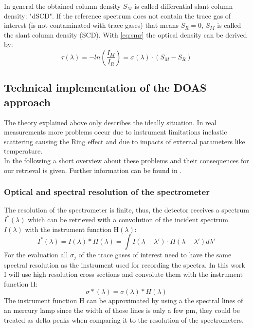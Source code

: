 \documentclass  [
  paper    = a4,
  BCOR     = 10mm,
  twoside,
  fontsize = 12pt,
  fleqn,
  toc      = bibnumbered,
  toc      = listofnumbered,
  numbers  = noendperiod,
  headings = normal,
  listof   = leveldown,
  version  = 3.03
]                                       {scrreprt}
\begin{document}
	In general the obtained column density $S_{M}$ is called differential slant column density: "dSCD". If the reference spectrum does not contain the trace gas of interest (is not contaminated with trace gases) that means $S_{R} = 0$, $S_{M}$ is called the slant column	density (SCD). 
	With \cref{eq:smr} the optical density can be derived by:
	\begin{equation}
	\tau\left(\lambda\right) = -ln\left(\frac{I_{M}}{I_{R}}\right) = \sigma\left(\lambda\right)\cdot\left(S_{M}-S_{R}\right)
	\end{equation}
	
	
	\subsection{Technical implementation of the DOAS approach}
	The theory explained above only describes the ideally situation. In real measurements more problems occur due to instrument limitations inelastic scattering causing the Ring effect and due to impacts of external parameters like temperature.\\
	In the following a short overview about these problems and their consequences for our retrieval is given. Further information can be found in \citet{lubcke2014optical}.\\
	\subsubsection*{Optical and spectral resolution of the spectrometer}
	The resolution of the spectrometer is finite, thus, the detector receives a spectrum $I^{*}\left(\lambda\right)$ which can be retrieved with a convolution of the incident spectrum $I\left(\lambda\right)$ with the instrument function H$\left(\lambda\right)$:
	\begin{equation}
	I^{*}\left(\lambda\right) = I\left(\lambda\right)*H\left(\lambda\right)=\int I\left(\lambda-\lambda{'}\right)\cdot H\left(\lambda-\lambda{'}\right)d\lambda{'}
	\end{equation} 
	For the evaluation all $\sigma_{j}$  of the trace gases of interest need to have the same spectral resolution as the instrument used for recording the spectra. In this work I will use high resolution cross sections and convolute them with the instrument function H:
	\begin{equation}
	\sigma{*}\left(\lambda\right) = \sigma\left(\lambda\right)*H\left(\lambda\right)
	\end{equation}
	The instrument function H can be approximated by using a the spectral lines of an mercury lamp since the width of those lines is only a few pm, they could be treated as delta peaks when comparing it to the resolution of the spectrometers.
	
\end{document}
